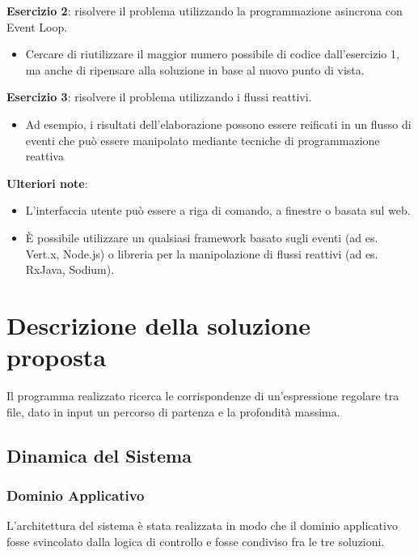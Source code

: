﻿\documentclass[a4paper]{article}
\begin{document}
\textbf{Esercizio 2}: risolvere il problema utilizzando la programmazione asincrona con Event Loop.

\begin{itemize}
%
    \item Cercare di riutilizzare il maggior numero possibile di codice dall'esercizio 1, ma anche di ripensare alla soluzione in base al nuovo punto di vista.
%
\end{itemize}

\textbf{Esercizio 3}: risolvere il problema utilizzando i flussi reattivi.

\begin{itemize}
%
        \item Ad esempio, i risultati dell'elaborazione possono essere reificati in un flusso di eventi che pu\`o essere manipolato mediante tecniche di programmazione reattiva
%
    \end{itemize}

\textbf{Ulteriori note}:

\begin{itemize}
%
    \item L'interfaccia utente pu\`o essere a riga di comando, a finestre o basata sul web.
%
    \item \`E possibile utilizzare un qualsiasi framework basato sugli eventi (ad es. Vert.x, Node.js) o libreria per la manipolazione di flussi reattivi (ad es. RxJava, Sodium).
%
\end{itemize}

\section{Descrizione della soluzione proposta}\label{descrizione-della-soluzione-proposta}

Il programma realizzato ricerca le corrispondenze di un'espressione regolare tra file, dato in input un percorso di partenza e la profondit\`a massima.

\subsection{Dinamica del Sistema}

\subsubsection{Dominio Applicativo}

L'architettura del sistema \`e stata realizzata in modo che il dominio applicativo fosse svincolato dalla logica di controllo e fosse condiviso fra le tre soluzioni.
\end{document}
